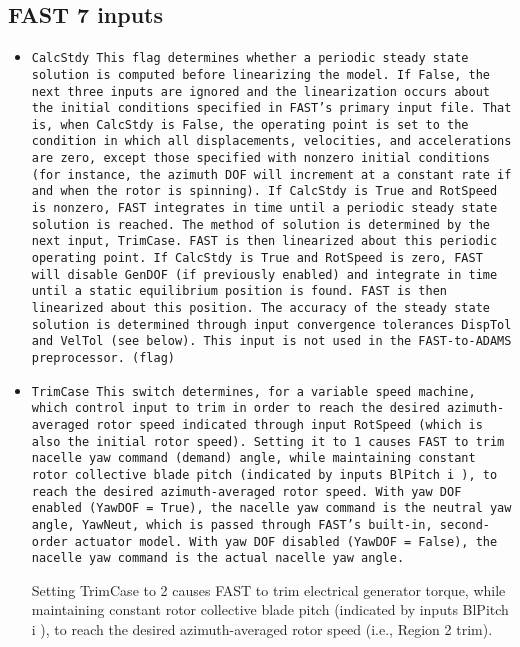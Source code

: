 \subsection{FAST 7 inputs}
\begin{itemize}\tightlist
    \item \tt{CalcStdy} This flag determines whether a periodic steady state solution is computed before linearizing the
model. If False, the next three inputs are ignored and the linearization occurs about the initial
conditions specified in FAST’s primary input file. That is, when CalcStdy is False, the operating
point is set to the condition in which all displacements, velocities, and accelerations are zero,
except those specified with nonzero initial conditions (for instance, the azimuth DOF will
increment at a constant rate if and when the rotor is spinning). If CalcStdy is True and
RotSpeed is nonzero, FAST integrates in time until a periodic steady state solution is reached.
The method of solution is determined by the next input, TrimCase. FAST is then linearized
about this periodic operating point. If CalcStdy is True and RotSpeed is zero, FAST will
disable GenDOF (if previously enabled) and integrate in time until a static equilibrium position is
found. FAST is then linearized about this position. The accuracy of the steady state solution is
determined through input convergence tolerances DispTol and VelTol (see below). This input is
not used in the FAST-to-ADAMS preprocessor. (flag)

\item \tt{TrimCase} This switch determines, for a variable speed machine, which control input to trim in order to reach
the desired azimuth-averaged rotor speed indicated through input RotSpeed (which is also the
initial rotor speed). 
 Setting it to 1 causes FAST to trim nacelle yaw command (demand) angle,
while maintaining constant rotor collective blade pitch (indicated by inputs BlPitch i ), to reach the
desired azimuth-averaged rotor speed. With yaw DOF enabled (YawDOF = True), the nacelle
yaw command is the neutral yaw angle, YawNeut, which is passed through FAST’s built-in,
second-order actuator model. With yaw DOF disabled (YawDOF = False), the nacelle yaw
command is the actual nacelle yaw angle. 

Setting TrimCase to 2 causes FAST to trim electrical
generator torque, while maintaining constant rotor collective blade pitch (indicated by inputs
BlPitch i ), to reach the desired azimuth-averaged rotor speed (i.e., Region 2 trim). 


\end{itemize}
